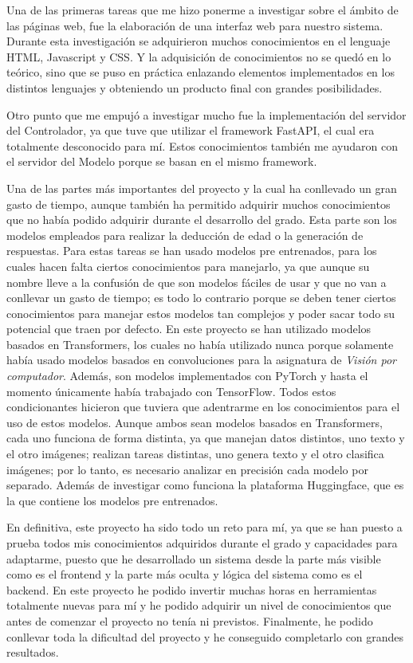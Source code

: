 Una de las primeras tareas que me hizo ponerme a investigar sobre el ámbito de las páginas web, fue la elaboración de una interfaz web para nuestro sistema. Durante esta investigación se adquirieron muchos conocimientos en el lenguaje HTML, Javascript y CSS. Y la adquisición de conocimientos no se quedó en lo teórico, sino que se puso en práctica enlazando elementos implementados en los distintos lenguajes y obteniendo un producto final con grandes posibilidades.

Otro punto que me empujó a investigar mucho fue la implementación del servidor del Controlador, ya que tuve que utilizar el framework FastAPI, el cual era totalmente desconocido para mí. Estos conocimientos también me ayudaron con el servidor del Modelo porque se basan en el mismo framework.

Una de las partes más importantes del proyecto y la cual ha conllevado un gran gasto de tiempo, aunque también ha permitido adquirir muchos conocimientos que no había podido adquirir durante el desarrollo del grado. Esta parte son los modelos empleados para realizar la deducción de edad o la generación de respuestas. Para estas tareas se han usado modelos pre entrenados, para los cuales hacen falta ciertos conocimientos para manejarlo, ya que aunque su nombre lleve a la confusión de que son modelos fáciles de usar y que no van a conllevar un gasto de tiempo; es todo lo contrario porque se deben tener ciertos conocimientos para manejar estos modelos tan complejos y poder sacar todo su potencial que traen por defecto. En este proyecto se han utilizado modelos basados en Transformers, los cuales no había utilizado nunca porque solamente había usado modelos basados en convoluciones para la asignatura de \textit{Visión por computador}. Además, son modelos implementados con PyTorch y hasta el momento únicamente había trabajado con TensorFlow. Todos estos condicionantes hicieron que tuviera que adentrarme en los conocimientos para el uso de estos modelos. Aunque ambos sean modelos basados en Transformers, cada uno funciona de forma distinta, ya que manejan datos distintos, uno texto y el otro imágenes; realizan tareas distintas, uno genera texto y el otro clasifica imágenes; por lo tanto, es necesario analizar en precisión cada modelo por separado. Además de investigar como funciona la plataforma Huggingface, que es la que contiene los modelos pre entrenados.

En definitiva, este proyecto ha sido todo un reto para mí, ya que se han puesto a prueba todos mis conocimientos adquiridos durante el grado y capacidades para adaptarme, puesto que he desarrollado un sistema desde la parte más visible como es el frontend y la parte más oculta y lógica del sistema como es el backend. En este proyecto he podido invertir muchas horas en herramientas totalmente nuevas para mí y he podido adquirir un nivel de conocimientos que antes de comenzar el proyecto no tenía ni previstos. Finalmente, he podido conllevar toda la dificultad del proyecto y he conseguido completarlo con grandes resultados.

